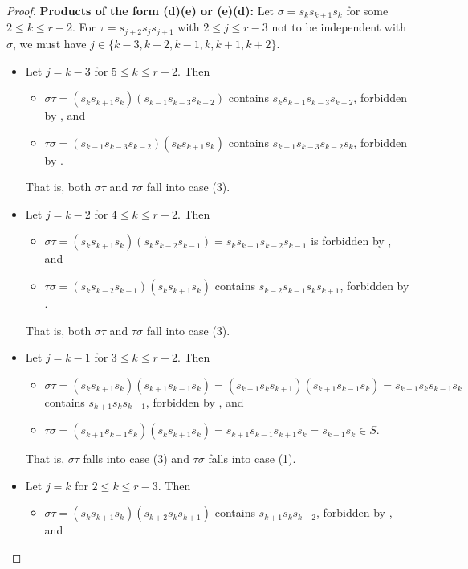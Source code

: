 \documentclass{amsart}
\theoremstyle{definition}
\begin{document}
\begin{appendices}
\begin{proof}
\noindent \textbf{Products of the form (d)(e) or (e)(d):}
    Let $\sigma=s_ks_{k+1}s_k$ for some $2\leq k\leq r-2$. For $\tau=s_{j+2}s_js_{j+1}$ with $2\leq j\leq r-3$ not to be independent with $\sigma$, we must have $j\in\{k-3,k-2,k-1,k,k+1,k+2\}$.
        \begin{itemize}
        \item Let $j=k-3$ for $5\leq k\leq r-2$. Then \begin{itemize}
            \item $\sigma\tau=(s_ks_{k+1}s_k)(s_{k-1}s_{k-3}s_{k-2})$ contains $s_ks_{k-1}s_{k-3}s_{k-2}$, forbidden by , and
            \item $\tau\sigma=(s_{k-1}s_{k-3}s_{k-2})(s_ks_{k+1}s_k)$ contains $s_{k-1}s_{k-3}s_{k-2}s_k$, forbidden by .
        \end{itemize}
        That is, both $\sigma\tau$ and $\tau\sigma$ fall into case (3).
        \item Let $j=k-2$ for $4\leq k\leq r-2$. Then \begin{itemize}
            \item $\sigma\tau=(s_ks_{k+1}s_k)(s_{k}s_{k-2}s_{k-1})=s_ks_{k+1}s_{k-2}s_{k-1}$ is forbidden by , and
            \item $\tau\sigma=(s_{k}s_{k-2}s_{k-1})(s_ks_{k+1}s_k)$ contains $s_{k-2}s_{k-1}s_ks_{k+1}$, forbidden by .
        \end{itemize}
        That is, both $\sigma\tau$ and $\tau\sigma$ fall into case (3).
        \item Let $j=k-1$ for $3\leq k\leq r-2$. Then \begin{itemize}
            \item $\sigma\tau=(s_ks_{k+1}s_k)(s_{k+1}s_{k-1}s_{k}) = (s_{k+1}s_ks_{k+1})(s_{k+1}s_{k-1}s_k) = s_{k+1}s_ks_{k-1}s_k$ contains \newline $s_{k+1}s_ks_{k-1}$, forbidden by , and
            \item $\tau\sigma=(s_{k+1}s_{k-1}s_{k})(s_ks_{k+1}s_k) = s_{k+1}s_{k-1}s_{k+1}s_k = s_{k-1}s_k\in S$.
        \end{itemize}
        That is, $\sigma\tau$ falls into case (3) and $\tau\sigma$ falls into case (1).
        \item Let $j=k$ for $2\leq k\leq r-3$. Then \begin{itemize}
            \item $\sigma\tau=(s_ks_{k+1}s_k)(s_{k+2}s_{k}s_{k+1})$ contains $s_{k+1}s_ks_{k+2}$, forbidden by , and

\end{itemize}
\end{itemize}
\end{proof}
\end{appendices}
\end{document}
